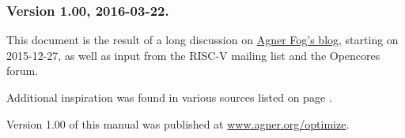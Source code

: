\documentclass[forwardcom.tex]{subfiles}
\begin{document}
\subsubsection{Version 1.00, 2016-03-22.}
This document is the result of a long discussion on 
\href{http://www.agner.org/optimize/blog/read.php?i=421}{Agner Fog's blog}, starting on 2015-12-27, as well as input from the RISC-V mailing list and the Opencores forum.
\vv

Additional inspiration was found in various sources listed on page \pageref{referencesToIntroduction}. 
\vv

Version 1.00 of this manual was published at 
\href{http://www.agner.org/optimize}{www.agner.org/optimize}.
\end{document}
